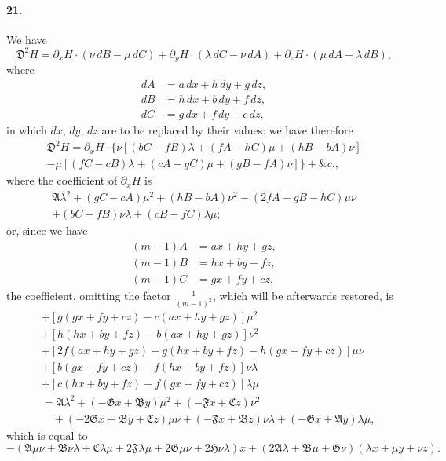 \documentclass[12pt,a4paper]{article}
\theoremstyle{plain}
\begin{document}
\paragraph{21.}
We   have
\[
\mathfrak{D}^2 H = \partial_x H \cdot (\nu\, dB - \mu\, dC) + \partial_y H \cdot (\lambda\, dC - \nu\, dA) + \partial_z H \cdot (\mu\, dA - \lambda\, dB),
\]
where
\begin{align*}
dA &= a\, dx + h\, dy + g\, dz, \\
dB &= h\, dx + b\, dy + f\, dz, \\
dC &= g\, dx + f\, dy + c\, dz,
\end{align*}
in  which  $dx$,  $dy$,  $dz$  are  to  be  replaced  by  their  values:   we  have  therefore
\begin{multline*}
\mathfrak{D}^2 H = \partial_x H \cdot \{\nu[(bC-fB)\lambda + (fA-hC)\mu + (hB-bA)\nu] \\
- \mu[(fC-cB)\lambda + (cA-gC)\mu + (gB-fA)\nu]\} + \&c.,
\end{multline*}
where  the  coefficient  of  $\partial_x H$  is
\begin{multline*}
\mathfrak{A}\lambda^2 + (gC-cA)\mu^2 + (hB-bA)\nu^2 - (2fA-gB-hC)\mu\nu \\
+ (bC-fB)\nu\lambda + (cB-fC)\lambda\mu;
\end{multline*}
or,  since  we  have
\begin{align*}
(m-1)A &= ax + hy + gz, \\
(m-1)B &= hx + by + fz, \\
(m-1)C &= gx + fy + cz,
\end{align*}
the  coefficient,  omitting  the  factor  $\frac{1}{(m-1)^2}$,  which  will  be  afterwards  restored,  is
\begin{align*}
&+ [g(gx+fy+cz)-c(ax+hy+gz)]\mu^2 \\
&+ [h(hx+by+fz)-b(ax+hy+gz)]\nu^2 \\
&+ [2f(ax+hy+gz)-g(hx+by+fz)-h(gx+fy+cz)]\mu\nu \\
&+ [b(gx+fy+cz)-f(hx+by+fz)]\nu\lambda \\
&+ [c(hx+by+fz)-f(gx+fy+cz)]\lambda\mu \\
&= \mathfrak{A}\lambda^2 + (-\mathfrak{G}x + \mathfrak{B}y)\mu^2 + (-\mathfrak{F}x + \mathfrak{C}z)\nu^2 \\
&\quad + (-2\mathfrak{G}x + \mathfrak{B}y + \mathfrak{C}z)\mu\nu + (-\mathfrak{F}x + \mathfrak{B}z)\nu\lambda + (-\mathfrak{G}x + \mathfrak{A}y)\lambda\mu,
\end{align*}
which  is  equal  to
\[
-(\mathfrak{A}\mu\nu + \mathfrak{B}\nu\lambda + \mathfrak{C}\lambda\mu + 2\mathfrak{F}\lambda\mu + 2\mathfrak{G}\mu\nu + 2\mathfrak{H}\nu\lambda)x
+ (2\mathfrak{A}\lambda + \mathfrak{B}\mu + \mathfrak{G}\nu)(\lambda x + \mu y + \nu z).
\]
\end{document}
